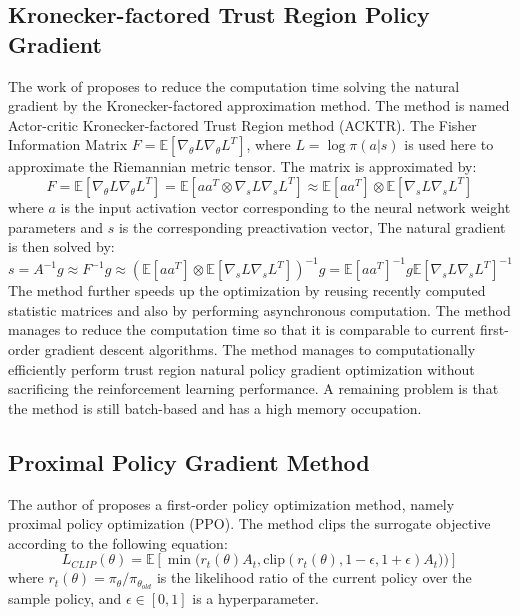 \subsection{Kronecker-factored Trust Region Policy Gradient}
The work of \cite{wu2017scalable} proposes to reduce the computation time solving the natural gradient by the Kronecker-factored approximation method. The method is named Actor-critic  Kronecker-factored Trust Region method (ACKTR).
The Fisher Information Matrix $F=\mathbb{E}[\nabla_\theta L \nabla_\theta L^T]$, where $L=\log\pi(a|s)$ is used here to approximate the Riemannian metric tensor.
The matrix is approximated by:
\begin{equation*}
    F=\mathbb{E}[\nabla_\theta L \nabla_\theta L^T] = \mathbb{E}[aa^T \otimes \nabla_s L \nabla_s L^T ] 
    \approx \mathbb{E}[aa^T] \otimes \mathbb{E}[\nabla_s L \nabla_s L^T ] 
\end{equation*}
where $a$ is the input activation vector corresponding to the neural network weight parameters and $s$ is the corresponding preactivation vector,
The natural gradient is then solved by:
\begin{equation}
    s=A^{-1}g \approx F^{-1}g \approx \left(\mathbb{E}[aa^T] \otimes \mathbb{E}[\nabla_s L \nabla_s L^T ] \right)^{-1}g = \mathbb{E}[aa^T]^{-1} g  \mathbb{E}[\nabla_s L \nabla_s L^T ]^{-1}
\end{equation}
The method further speeds up the optimization by reusing recently computed statistic matrices and also by performing asynchronous computation. The method manages to reduce the computation time so that it is comparable to current first-order gradient descent algorithms.
The method manages to computationally efficiently perform trust region natural policy gradient optimization without sacrificing the reinforcement learning performance. A remaining problem is that the method is still batch-based and has a high memory occupation.

\subsection{Proximal Policy Gradient Method}
The author of \cite{schulman2017proximal} proposes a first-order policy optimization method, namely proximal policy optimization (PPO). The method clips the surrogate objective according to the following equation:
\begin{equation}
    L_{CLIP}(\theta) = \mathbb{E} \left[ \min\big(r_t(\theta) A_t , \mathrm{clip}(r_t(\theta),1-\epsilon,1+\epsilon)A_t)\big) \right]
\end{equation}
where $r_t(\theta) = \pi_\theta / \pi_{\theta_{old}}$ is the likelihood ratio of the current policy over the sample policy, and $\epsilon \in [0,1]$ is a hyperparameter. 

